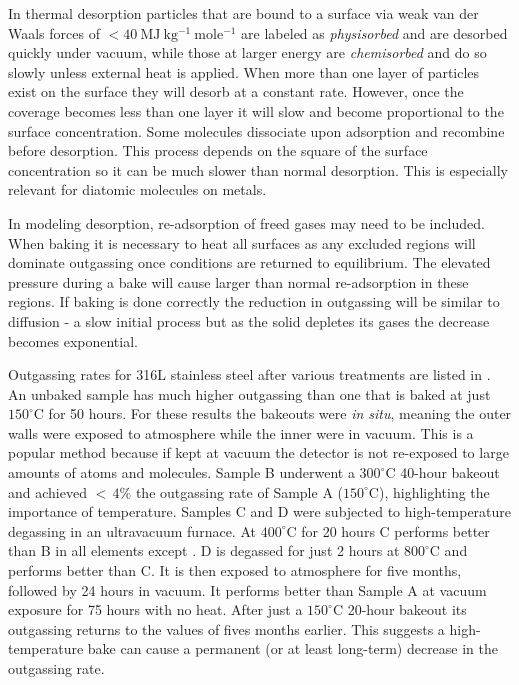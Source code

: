 In thermal desorption particles that are bound to a surface via weak van der Waals forces of
$< 40\ \mathrm{MJ\ kg^{-1}\ mole^{-1}}$ are labeled
as \textit{physisorbed} and are desorbed quickly under vacuum, while those at larger energy are \textit{chemisorbed} and do so slowly
unless external heat is applied.  When more than one layer of particles exist on the surface they will desorb at a constant
rate.  However, once
the coverage becomes less than one layer it will slow and become proportional to the surface concentration.  Some molecules
dissociate upon adsorption and recombine before desorption.  This process depends on the square of the
surface concentration so it can be much slower than normal desorption.  This is especially relevant for diatomic molecules
on metals.

In modeling desorption, re-adsorption of freed gases may need to be included.  When baking it is necessary to heat all surfaces as
any excluded regions will dominate outgassing once conditions are returned to equilibrium.  The elevated pressure during a bake will
cause larger than normal re-adsorption in these regions.  If baking is done correctly the reduction in
outgassing will be similar to diffusion - a slow initial process but as the solid depletes its gases the decrease becomes
exponential.

Outgassing rates for 316L stainless steel after various treatments are listed in
 .  An unbaked sample has
much higher outgassing than one that is baked at just $150^{\circ}\mathrm{C}$ for 50 hours.  For these results the bakeouts were
\textit{in situ}, meaning the outer walls were exposed to atmosphere while the inner were in vacuum.  This is a popular method because
if kept at vacuum the detector is not re-exposed to large amounts of atoms and molecules.  Sample B underwent a $300^{\circ}\mathrm{C}$
40-hour bakeout and achieved ${<}\, 4\%$ the  outgassing rate of Sample A ($150^{\circ}\mathrm{C}$), highlighting the importance
of temperature.  Samples C and D
were subjected to high-temperature degassing in an ultravacuum furnace.  At $400^{\circ}\mathrm{C}$ for 20 hours C performs better than B
in all elements except .  D is degassed for just 2 hours at $800^{\circ}\mathrm{C}$ and performs better than C.  It is then
exposed to atmosphere for five months, followed by 24 hours in vacuum.  It performs better than Sample A at vacuum exposure for 75 hours
with no heat.  After just a $150^{\circ}\mathrm{C}$ 20-hour bakeout its outgassing returns to the values of fives months
earlier.  This suggests a high-temperature bake can cause a permanent (or at least long-term) decrease in the outgassing rate.

